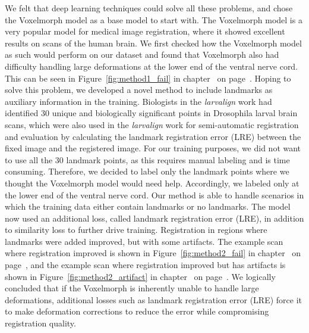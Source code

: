 \documentclass{book}
\begin{document}
	
	We felt that deep learning techniques could solve all these problems, and chose the Voxelmorph \cite{Balakrishnan_2019} model as a base model to start with. The Voxelmorph model is a very popular model for medical image registration, where it showed excellent results on scans of the human brain. We first checked how the Voxelmorph model as such would perform on our dataset and found that Voxelmorph also had difficulty handling large deformations at the lower end of the ventral nerve cord. This can be seen in Figure~\ref{fig:method1_fail} in chapter~ on page~\pageref{fig:method1_fail}. Hoping to solve this problem, we developed a novel method to include landmarks as auxiliary information in the training. Biologists in the \textit{larvalign} work had identified 30 unique and biologically significant points in Drosophila larval brain scans, which were also used in the \textit{larvalign} work for semi-automatic registration and evaluation by calculating the landmark registration error (LRE) between the fixed image and the registered image. For our training purposes, we did not want to use all the 30 landmark points, as this requires manual labeling and is time consuming. Therefore, we decided to label only the landmark points where we thought the Voxelmorph model would need help. Accordingly, we labeled only at the lower end of the ventral nerve cord. Our method is able to handle scenarios in which the training data either contain landmarks or no landmarks. The model now used an additional loss, called landmark registration error (LRE), in addition to similarity loss to further drive training. Registration in regions where landmarks were added improved, but with some artifacts. The example scan where registration improved is shown in Figure~\ref{fig:method2_fail} in chapter~ on page~\pageref{fig:method2_fail}, and the example scan where registration improved but has artifacts is shown in Figure~\ref{fig:method2_artifact} in chapter~ on page~\pageref{fig:method2_artifact}. We logically concluded that if the Voxelmorph is inherently unable to handle large deformations, additional losses such as landmark registration error (LRE) force it to make deformation corrections to reduce the error while compromising registration quality.
	
\end{document}
